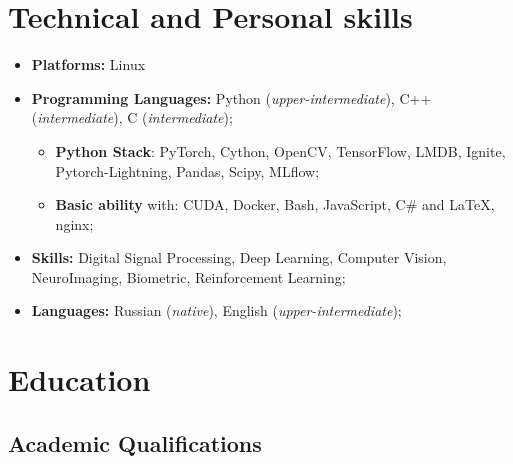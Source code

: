 \documentclass[10pt,a4paper,sans]{moderncv}
\begin{document}
\begin{itemize}
\end{itemize}


\section{Technical and Personal skills}

\vspace{6pt}

\begin{itemize}

\item \textbf{Platforms:} Linux
\vspace{2pt}
\item \textbf{Programming Languages:} Python (\textit{upper-intermediate}), C++ (\textit{intermediate}), C (\textit{intermediate});
\begin{itemize}
	\item \textbf{Python Stack}: PyTorch, Cython, OpenCV, TensorFlow, LMDB, Ignite, Pytorch-Lightning, Pandas, Scipy, MLflow;
    \item \textbf{Basic ability} with: CUDA, Docker, Bash, JavaScript, C\# and \LaTeX, nginx;
\end{itemize}
\vspace{2pt}
\item \textbf{Skills:} Digital Signal Processing, Deep Learning, Computer Vision, NeuroImaging, Biometric, Reinforcement Learning;
\vspace{2pt}
\item \textbf{Languages:} Russian (\textit{native}), English (\textit{upper-intermediate});
\end{itemize}




\section{Education}

\vspace{5pt}

\subsection{Academic Qualifications}

\vspace{5pt}
\end{document}
